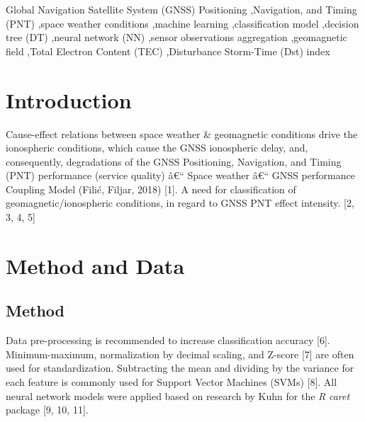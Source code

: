 \documentclass[preprint,12pt]{elsarticle}
\begin{document}
\begin{frontmatter}
\begin{keyword}
Global Navigation Satellite System (GNSS) Positioning \sep Navigation, and Timing (PNT) \sep space weather conditions \sep machine learning \sep classification model \sep decision tree (DT) \sep neural network (NN) \sep sensor observations aggregation \sep geomagnetic field \sep Total Electron Content (TEC) \sep Disturbance Storm-Time (Dst) index
\end{keyword}
\end{frontmatter}
\section{Introduction}
Cause-effect relations between space weather \& geomagnetic conditions drive the ionospheric
conditions, which cause the GNSS ionospheric delay, and, consequently, degradations of the GNSS
Positioning, Navigation, and Timing (PNT) performance (service quality) â€“ Space weather â€“ GNSS
performance Coupling Model (Fili\'{c}, Filjar, 2018) [1].
A need for classification of geomagnetic/ionospheric conditions, in regard to GNSS PNT effect
intensity.
[2, 3, 4, 5]

\section{Method and Data}

\subsection{Method}

Data pre-processing is recommended to increase classification accuracy [6]. Minimum-maximum, normalization by decimal scaling, and Z-score [7] are often used for standardization. Subtracting the mean and dividing by the variance for each feature is commonly used for Support Vector Machines (SVMs) [8].
All neural network models were applied based on research by Kuhn for the \textit{R} \textit{caret} package [9, 10, 11].
\end{document}
